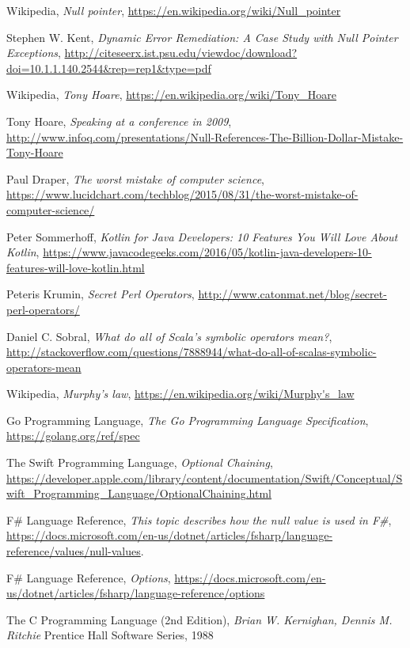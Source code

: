 \documentclass[11pt, a4paper]{report}
\begin{document}
\listoffigures

\begin{thebibliography}{100}
	
    Wikipedia,
    \emph{Null pointer},
    \url{https://en.wikipedia.org/wiki/Null_pointer}

    Stephen W. Kent,
    \textit{Dynamic Error Remediation: A Case Study with Null Pointer Exceptions},
    \url{http://citeseerx.ist.psu.edu/viewdoc/download?doi=10.1.1.140.2544&rep=rep1&type=pdf}

    Wikipedia,
    \textit{Tony Hoare},
    \url{https://en.wikipedia.org/wiki/Tony_Hoare}
    
    Tony Hoare,
    \textit{Speaking at a conference in 2009},
    \url{http://www.infoq.com/presentations/Null-References-The-Billion-Dollar-Mistake-Tony-Hoare}

    Paul Draper,
    \textit{The worst mistake of computer science},
    \url{https://www.lucidchart.com/techblog/2015/08/31/the-worst-mistake-of-computer-science/}

 	Peter Sommerhoff,
 	\textit{Kotlin for Java Developers: 10 Features You Will Love About Kotlin},
 	\url{https://www.javacodegeeks.com/2016/05/kotlin-java-developers-10-features-will-love-kotlin.html}

    Peteris Krumin,
    \textit{Secret Perl Operators},
    \url{http://www.catonmat.net/blog/secret-perl-operators/}

    Daniel C. Sobral,
    \textit{What do all of Scala's symbolic operators mean?},
    \url{http://stackoverflow.com/questions/7888944/what-do-all-of-scalas-symbolic-operators-mean}
    
    Wikipedia,
    \textit{Murphy's law},
    \url{https://en.wikipedia.org/wiki/Murphy's_law}

    Go Programming Language,
    \textit{The Go Programming Language Specification},
    \url{https://golang.org/ref/spec}

    The Swift Programming Language,
    \textit{Optional Chaining},
    \url{https://developer.apple.com/library/content/documentation/Swift/Conceptual/Swift_Programming_Language/OptionalChaining.html}
    
    F\# Language Reference,
    \textit{This topic describes how the null value is used in F\#},
    \url{https://docs.microsoft.com/en-us/dotnet/articles/fsharp/language-reference/values/null-values}.

    F\# Language Reference,
    \textit{Options},
    \url{https://docs.microsoft.com/en-us/dotnet/articles/fsharp/language-reference/options}

    The C Programming Language (2nd Edition),
    \textit{Brian W. Kernighan, Dennis M. Ritchie}
    Prentice Hall Software Series, 1988
\end{thebibliography}
\end{document}
